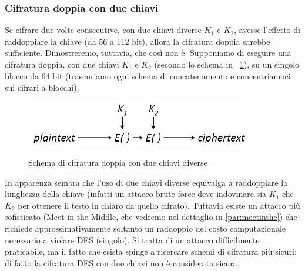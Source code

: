 \subsubsection{Cifratura doppia con due chiavi}
Se cifrare due volte consecutive, con due chiavi diverse $K_{1}$ e $K_{2}$, avesse l'effetto di raddoppiare la chiave (da 56 a 112 bit), allora la cifratura doppia sarebbe sufficiente. Dimostreremo, tuttavia, che così non è.
\newline \newline
Supponiamo di eseguire una cifratura doppia, con due chiavi $K_{1}$ e $K_{2}$ (secondo lo schema in \figurename~\ref{fig:Cif_doppia_dueK}), su un singolo blocco da 64 bit (trascuriamo ogni schema di concatenamento e concentriamoci sui cifrari a blocchi). 
\begin{figure}[htbp]
	\centering%
	\subfigure%
	{\includegraphics[height=2cm, width=10cm, keepaspectratio]{Immagini/modalita_operative/Cif_doppia_dueK.png}}
	\caption{Schema di cifratura doppia con due chiavi diverse \label{fig:Cif_doppia_dueK}} 
\end{figure}
In apparenza sembra che l'uso di due chiavi diverse equivalga a raddoppiare la lunghezza della chiave (infatti un attacco brute force deve indovinare sia $K_{1}$ che $K_{2}$ per ottenere il testo in chiaro da quello cifrato). Tuttavia esiste un attacco più sofisticato (Meet in the Middle, che vedremo nel dettaglio in \ref{par:meetinthe}) che richiede approssimativamente soltanto un raddoppio del costo computazionale necessario a violare DES (singolo). Si tratta di un attacco difficilmente praticabile, ma il fatto che esista spinge a ricercare schemi di cifratura più sicuri: di fatto la cifratura DES con due chiavi non è considerata sicura. 
